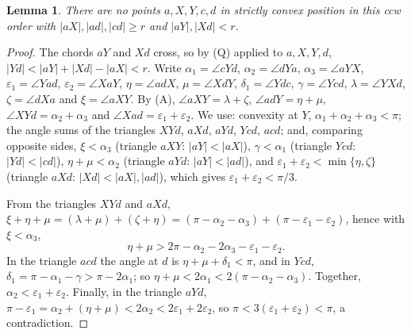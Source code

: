 \documentclass[11pt,a4paper]{article}
\newtheorem{lemma}[theorem]{Lemma}
\theoremstyle{definition}
\theoremstyle{remark}
\newcommand{\ang}{\angle}
\begin{document}
\begin{lemma}\label{lem:core}
There are no points $a,X,Y,c,d$ in strictly convex position in this ccw order
with $|aX|,|ad|,|cd|\ge r$ and $|aY|,|Xd|<r$.
\end{lemma}
\begin{proof}
The chords $aY$ and $Xd$ cross, so by (Q) applied to $a,X,Y,d$,
$|Yd|<|aY|+|Xd|-|aX|<r$. Write $\alpha_1=\ang cYd$, $\alpha_2=\ang dYa$,
$\alpha_3=\ang aYX$, $\varepsilon_1=\ang Yad$, $\varepsilon_2=\ang XaY$,
$\eta=\ang adX$, $\mu=\ang XdY$, $\delta_1=\ang Ydc$, $\gamma=\ang Ycd$,
$\lambda=\ang YXd$, $\zeta=\ang dXa$ and $\xi=\ang aXY$. By (A),
$\ang aXY=\lambda+\zeta$, $\ang adY=\eta+\mu$, $\ang XYd=\alpha_2+\alpha_3$
and $\ang Xad=\varepsilon_1+\varepsilon_2$. We use: convexity at $Y$,
$\alpha_1+\alpha_2+\alpha_3<\pi$; the angle sums of the triangles $XYd$,
$aXd$, $aYd$, $Ycd$, $acd$; and, comparing opposite sides,
$\xi<\alpha_3$ (triangle $aXY$: $|aY|<|aX|$),
$\gamma<\alpha_1$ (triangle $Ycd$: $|Yd|<|cd|$),
$\eta+\mu<\alpha_2$ (triangle $aYd$: $|aY|<|ad|$), and
$\varepsilon_1+\varepsilon_2<\min\{\eta,\zeta\}$ (triangle $aXd$:
$|Xd|<|aX|,|ad|$), which gives $\varepsilon_1+\varepsilon_2<\pi/3$.

From the triangles $XYd$ and $aXd$,
$\xi+\eta+\mu=(\lambda+\mu)+(\zeta+\eta)
=(\pi-\alpha_2-\alpha_3)+(\pi-\varepsilon_1-\varepsilon_2)$, hence with
$\xi<\alpha_3$,
\[\eta+\mu>2\pi-\alpha_2-2\alpha_3-\varepsilon_1-\varepsilon_2.\]
In the triangle $acd$ the angle at $d$ is $\eta+\mu+\delta_1<\pi$, and in
$Ycd$, $\delta_1=\pi-\alpha_1-\gamma>\pi-2\alpha_1$; so $\eta+\mu<2\alpha_1<
2(\pi-\alpha_2-\alpha_3)$. Together, $\alpha_2<\varepsilon_1+\varepsilon_2$.
Finally, in the triangle $aYd$,
$\pi-\varepsilon_1=\alpha_2+(\eta+\mu)<2\alpha_2<2\varepsilon_1+2\varepsilon_2$,
so $\pi<3(\varepsilon_1+\varepsilon_2)<\pi$, a contradiction.
\end{proof}
\end{document}

